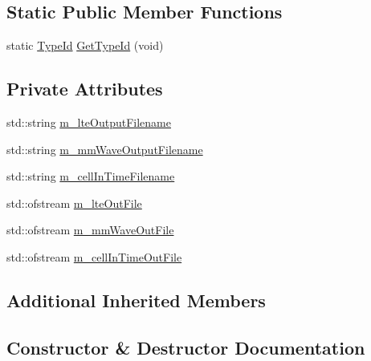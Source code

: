 \subsection*{Static Public Member Functions}
\begin{DoxyCompactItemize}
\item 
static \hyperlink{classns3_1_1TypeId}{Type\+Id} \hyperlink{classns3_1_1McStatsCalculator_a649191e0ed2448d93af6b29c29f2dbc6}{Get\+Type\+Id} (void)
\end{DoxyCompactItemize}
\subsection*{Private Attributes}
\begin{DoxyCompactItemize}
\item 
std\+::string \hyperlink{classns3_1_1McStatsCalculator_a8a0bf6a1e0eec7cf193bf72d3f04a871}{m\+\_\+lte\+Output\+Filename}
\item 
std\+::string \hyperlink{classns3_1_1McStatsCalculator_ab290568007b5006b54a91b42440c465a}{m\+\_\+mm\+Wave\+Output\+Filename}
\item 
std\+::string \hyperlink{classns3_1_1McStatsCalculator_a4c80354814d6a0fa259a5c91d7dcddbf}{m\+\_\+cell\+In\+Time\+Filename}
\item 
std\+::ofstream \hyperlink{classns3_1_1McStatsCalculator_a51facf0035409afc5ade3c66b52e1a49}{m\+\_\+lte\+Out\+File}
\item 
std\+::ofstream \hyperlink{classns3_1_1McStatsCalculator_affb91cbd165376d7e0a6a822326ea60d}{m\+\_\+mm\+Wave\+Out\+File}
\item 
std\+::ofstream \hyperlink{classns3_1_1McStatsCalculator_ab51995298fc09b03a476873e6b8043db}{m\+\_\+cell\+In\+Time\+Out\+File}
\end{DoxyCompactItemize}
\subsection*{Additional Inherited Members}


\subsection{Constructor \& Destructor Documentation}
